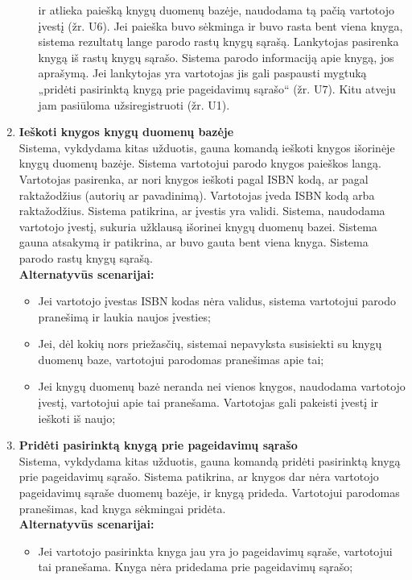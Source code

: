 \documentclass{VUMIFPSkursinis}
\begin{document}
\begin{enumerate}[label=\textbf{U\arabic*.}]
\begin{itemize}
						ir atlieka paiešką knygų duomenų bazėje, naudodama tą pačią vartotojo įvestį (žr. U6). Jei paieška buvo sėkminga ir buvo rasta bent viena knyga, 
						sistema rezultatų lange parodo rastų knygų sąrašą. Lankytojas pasirenka knygą iš rastų knygų sąrašo.
						Sistema parodo informaciją apie knygą, jos aprašymą. Jei lankytojas yra vartotojas jis gali paspausti mygtuką „pridėti pasirinktą knygą prie pageidavimų sąrašo“ (žr. U7).
						Kitu atveju jam pasiūloma užsiregistruoti (žr. U1).
				\end{itemize}
			\item \textbf{Ieškoti knygos knygų duomenų bazėje}\\
				Sistema, vykdydama kitas užduotis, gauna komandą ieškoti knygos išorinėje knygų duomenų bazėje. 
				Sistema vartotojui parodo knygos paieškos langą. Vartotojas pasirenka, ar nori knygos ieškoti pagal
				ISBN kodą, ar pagal raktažodžius (autorių ar pavadinimą). Vartotojas įveda ISBN kodą arba raktažodžius.
				Sistema patikrina, ar įvestis yra validi. Sistema, naudodama vartotojo įvestį, sukuria užklausą išorinei knygų duomenų bazei. 
				Sistema gauna atsakymą ir patikrina, ar buvo gauta bent viena knyga. Sistema parodo rastų knygų sąrašą.\\
				\textbf{Alternatyvūs scenarijai:}
				\begin{itemize}
					\item Jei vartotojo įvestas ISBN kodas nėra validus, sistema vartotojui parodo pranešimą ir laukia naujos įvesties;
					\item Jei, dėl kokių nors priežasčių, sistemai nepavyksta susisiekti su knygų duomenų baze, vartotojui parodomas pranešimas apie tai;
					\item Jei knygų duomenų bazė neranda nei vienos knygos, naudodama vartotojo įvestį, vartotojui apie tai pranešama. 
						Vartotojas gali pakeisti įvestį ir ieškoti iš naujo;
				\end{itemize}
			\item \textbf{Pridėti pasirinktą knygą prie pageidavimų sąrašo}\\
				Sistema, vykdydama kitas užduotis, gauna komandą pridėti pasirinktą knygą prie pageidavimų sąrašo.
				Sistema patikrina, ar knygos dar nėra vartotojo pageidavimų sąraše duomenų bazėje, ir knygą prideda.
				Vartotojui parodomas pranešimas, kad knyga sėkmingai pridėta.\\
				\textbf{Alternatyvūs scenarijai:}
				\begin{itemize}
					\item Jei vartotojo pasirinkta knyga jau yra jo pageidavimų sąraše, vartotojui tai pranešama. Knyga nėra pridedama prie pageidavimų sąrašo;

\end{itemize}
\end{enumerate}
\end{document}
